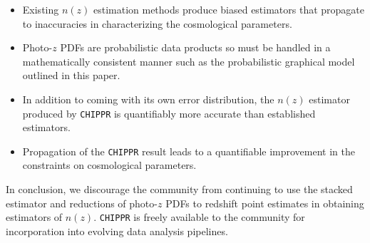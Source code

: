 \documentclass[iop]{emulateapj}
\newcommand{\chippr}{\texttt{CHIPPR} }
\begin{document}
\begin{itemize}
	\item Existing $n(z)$ estimation methods produce biased estimators that propagate to inaccuracies in characterizing the cosmological parameters.
	\item Photo-$z$ PDFs are probabilistic data products so must be handled in a mathematically consistent manner such as the probabilistic graphical model outlined in this paper.
	\item In addition to coming with its own error distribution, the $n(z)$ estimator produced by \chippr is quantifiably more accurate than established estimators.
	\item Propagation of the \chippr result leads to a quantifiable improvement in the constraints on cosmological parameters.
\end{itemize}

In conclusion, we discourage the community from continuing to use the stacked estimator and reductions of photo-$z$ PDFs to redshift point estimates in obtaining estimators of $n(z)$.  \chippr is freely available to the community for incorporation into evolving data analysis pipelines.  
\end{document}
